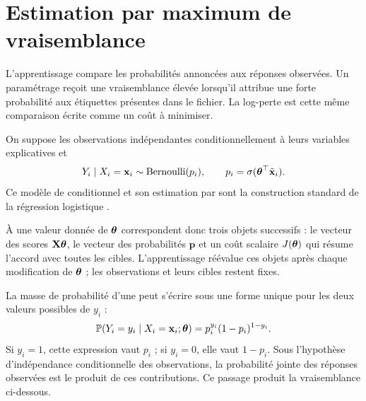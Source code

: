 \chapter{Estimation par maximum de vraisemblance}
\label{ch:likelihood}

\begin{lecture}
L'apprentissage compare les probabilités annoncées aux réponses observées. Un
paramétrage reçoit une vraisemblance élevée lorsqu'il attribue une forte
probabilité aux étiquettes présentes dans le fichier. La log-perte est cette même
comparaison écrite comme un coût à minimiser.
\end{lecture}

On suppose les observations indépendantes conditionnellement à leurs variables
explicatives et
\[
  Y_i\mid X_i=\mathbf{x}_i\sim
  \operatorname{Bernoulli}(p_i),\qquad p_i=\sigma(\boldsymbol{\theta}^\top\tilde{\mathbf{x}}_i).
\]
Ce modèle de  conditionnel et son estimation par  sont la construction standard de la régression logistique
\cite[sec.~4.4.1]{hastie2009,cox1958}.

À une valeur donnée de $\boldsymbol{\theta}$ correspondent donc trois objets successifs : le
vecteur des scores $\mathbf{X}\boldsymbol{\theta}$, le vecteur des probabilités $\mathbf p$ et un coût scalaire
$J(\boldsymbol{\theta})$ qui résume l'accord avec toutes les cibles. L'apprentissage réévalue
ces objets après chaque modification de $\boldsymbol{\theta}$ ; les observations et leurs
cibles restent fixes.

La masse de probabilité d'une  peut s'écrire sous une forme unique pour
les deux valeurs possibles de $y_i$ :
\[
  \mathbb{P}(Y_i=y_i\mid X_i=\mathbf{x}_i;\boldsymbol{\theta})
  =p_i^{y_i}(1-p_i)^{1-y_i}.
\]
Si $y_i=1$, cette expression vaut $p_i$ ; si $y_i=0$, elle vaut $1-p_i$. Sous
l'hypothèse d'indépendance conditionnelle des observations, la probabilité jointe
des réponses observées est le produit de ces contributions. Ce passage produit la
vraisemblance ci-dessous.

